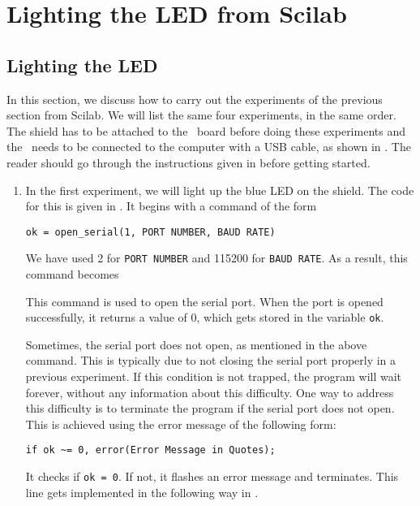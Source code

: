 \section{Lighting the LED from Scilab}
\subsection{Lighting the LED}
\label{sec:light-sci}
In this section, we discuss how to carry out the experiments of the
previous section from Scilab.  We will list the same four experiments,
in the same order.  The shield has to be attached to the \arduino\ board
before doing these experiments and the \arduino\ needs to be connected to the computer 
with a USB cable, as shown in .
The reader should go through the instructions given in
 before getting started. 
\begin{enumerate}
  \item In the first experiment, we will light up the blue LED on the
        shield.  The code for this is given in .  It
        begins with a command of the form
        \begin{lstlisting}[style=nonumbers]
     ok = open_serial(1, PORT NUMBER, BAUD RATE)
  \end{lstlisting}
        We have used 2 for {\tt PORT NUMBER} and 115200 for {\tt BAUD RATE}.
        As a result, this command becomes
        
        This command is used to open the serial port.  When the port is
        opened successfully, it returns a value of 0, which gets stored in
        the variable {\tt ok}.
        
        Sometimes, the serial port does not open, as mentioned in the above
        command.  This is typically due to not closing the serial port
        properly in a previous experiment.  If this condition is not
        trapped, the program will wait forever, without any information
        about this difficulty.  One way to address this difficulty is to
        terminate the program if the serial port does not open.  This is
        achieved using the error message of the following form:
        \begin{lstlisting}[style=nonumbers]
     if ok ~= 0, error(Error Message in Quotes);
  \end{lstlisting}
        It checks if {\tt ok = 0}.  If not, it flashes an error message and
        terminates.  This line gets implemented in the following way in
        .  
        
        

\end{enumerate}
